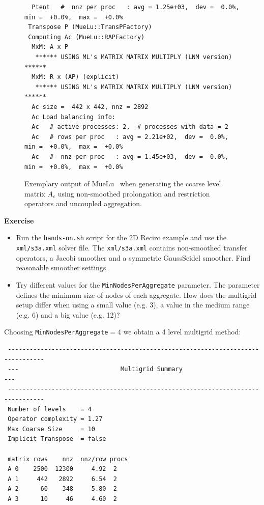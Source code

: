 \documentclass[12pt,a4paper]{article}
\newcommand{\MueLu}{MueLu}
\begin{document}
\begin{figure}
\begin{verbatim}
  Ptent   #  nnz per proc   : avg = 1.25e+03,  dev =  0.0%,  min =  +0.0%,  max =  +0.0%
 Transpose P (MueLu::TransPFactory)
 Computing Ac (MueLu::RAPFactory)
  MxM: A x P
   ****** USING ML's MATRIX MATRIX MULTIPLY (LNM version) ******
  MxM: R x (AP) (explicit)
   ****** USING ML's MATRIX MATRIX MULTIPLY (LNM version) ******
  Ac size =  442 x 442, nnz = 2892
  Ac Load balancing info:
  Ac   # active processes: 2,  # processes with data = 2
  Ac   # rows per proc   : avg = 2.21e+02,  dev =  0.0%,  min =  +0.0%,  max =  +0.0%
  Ac   #  nnz per proc   : avg = 1.45e+03,  dev =  0.0%,  min =  +0.0%,  max =  +0.0%
\end{verbatim}
\caption{Exemplary output of \MueLu~ when generating the coarse level matrix $A_c$ using non-smoothed prolongation and restriction operators and uncoupled aggregation.}
\label{fig:ucoutput}
\end{figure}

\begin{graybox}
 \textbf{Exercise}
 \begin{itemize}
  \item Run the \verb|hands-on.sh| script for the 2D Recirc example and use the \verb|xml/s3a.xml| solver file. The \verb|xml/s3a.xml| contains non-smoothed transfer operators, a Jacobi smoother and a symmetric GaussSeidel smoother. Find reasonable smoother settings.
  \item Try different values for the \verb|MinNodesPerAggregate| parameter. The parameter defines the minimum size of nodes of each aggregate. How does the multigrid setup differ when using a small value (e.g. 3), a value in the medium range (e.g. 6) and a big value (e.g. 12)?
 \end{itemize}
\end{graybox}

Choosing \verb|MinNodesPerAggregate|$=4$ we obtain a 4 level multigrid method:
{\footnotesize
\begin{verbatim}
 --------------------------------------------------------------------------------
 ---                            Multigrid Summary                             ---
 --------------------------------------------------------------------------------
 Number of levels    = 4
 Operator complexity = 1.27
 Max Coarse Size     = 10
 Implicit Transpose  = false

 matrix rows    nnz  nnz/row procs
 A 0    2500  12300     4.92  2
 A 1     442   2892     6.54  2
 A 2      60    348     5.80  2
 A 3      10     46     4.60  2
\end{verbatim}}
\end{document}
